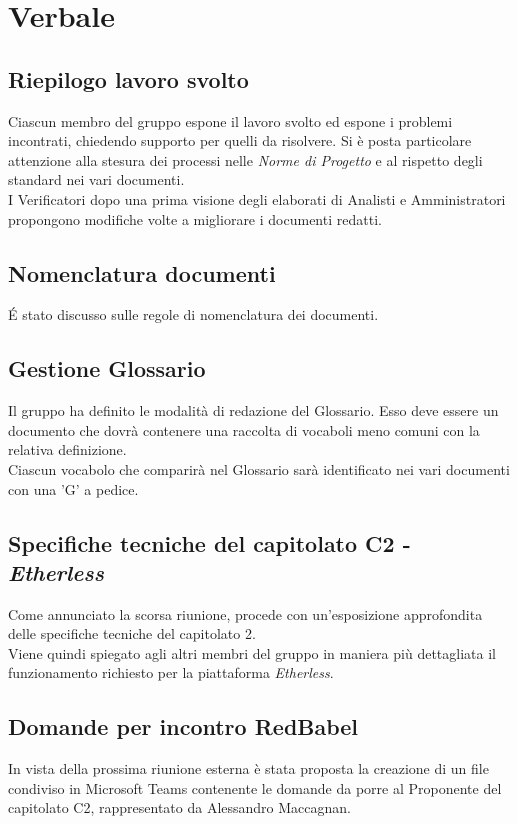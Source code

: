 \section{Verbale}
	
	\subsection{Riepilogo lavoro svolto}
		Ciascun membro del gruppo espone il lavoro svolto ed espone i problemi incontrati, chiedendo supporto per quelli da risolvere. Si è posta particolare attenzione alla stesura dei processi nelle \textit{Norme di Progetto} e al rispetto degli standard nei vari documenti.\\
		I Verificatori dopo una prima visione degli elaborati di Analisti e Amministratori propongono modifiche volte a migliorare i documenti redatti.
		
		
	\subsection{Nomenclatura documenti}
		\'E stato discusso sulle regole di nomenclatura dei documenti.
		
		
	\subsection{Gestione Glossario}
		Il gruppo ha definito le modalità di redazione del Glossario. Esso deve essere un documento che dovrà contenere una raccolta di vocaboli meno comuni con la relativa definizione.\\
		Ciascun vocabolo che comparirà nel Glossario sarà identificato nei vari documenti con una ’G’ a pedice.


	\subsection{Specifiche tecniche del capitolato C2 - \textit{Etherless}}
		Come annunciato la scorsa riunione, \EG{} procede con un'esposizione approfondita delle specifiche tecniche del capitolato 2.\\
		Viene quindi spiegato agli altri membri del gruppo in maniera più dettagliata il funzionamento richiesto per la piattaforma 
		\textit{Etherless}. 
		
	
	\subsection{Domande per incontro RedBabel}
		In vista della prossima riunione esterna è stata proposta la creazione di un file condiviso in Microsoft Teams contenente le domande da porre al Proponente del capitolato C2, rappresentato da Alessandro Maccagnan.


